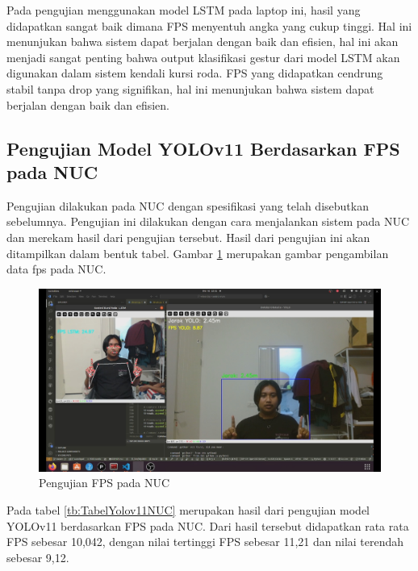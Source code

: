 Pada pengujian menggunakan model LSTM pada laptop ini, hasil yang didapatkan sangat baik dimana FPS menyentuh angka yang cukup tinggi. Hal ini menunjukan bahwa sistem dapat berjalan dengan baik dan efisien, hal ini akan menjadi sangat penting bahwa output klasifikasi gestur dari model LSTM akan digunakan dalam sistem kendali kursi roda. FPS yang didapatkan cendrung stabil tanpa drop yang signifikan, hal ini menunjukan bahwa sistem dapat berjalan dengan baik dan efisien.


\subsection{Pengujian Model YOLOv11 Berdasarkan FPS pada NUC}

Pengujian dilakukan pada NUC dengan spesifikasi yang telah disebutkan sebelumnya. Pengujian ini dilakukan dengan cara menjalankan sistem pada NUC dan merekam hasil dari pengujian tersebut. Hasil dari pengujian ini akan ditampilkan dalam bentuk tabel. Gambar \ref{fig:Foto pengujian fps NUC} merupakan gambar pengambilan data fps pada NUC.

\begin{figure} [H] \centering
  \includegraphics[scale=0.3]{gambar/v8devanuc.jpg}
  \caption{Pengujian FPS pada NUC}
  \label{fig:Foto pengujian fps NUC}
\end{figure}

Pada tabel \ref{tb:TabelYolov11NUC} merupakan hasil dari pengujian model YOLOv11 berdasarkan FPS pada NUC. Dari hasil tersebut didapatkan rata rata FPS sebesar 10,042, dengan nilai tertinggi FPS sebesar 11,21 dan nilai terendah sebesar 9,12.

